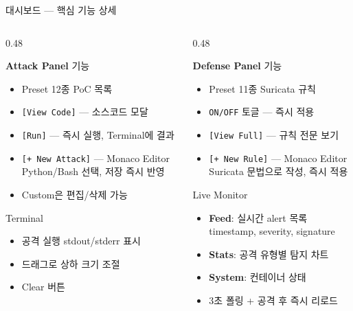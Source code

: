 \documentclass[aspectratio=169,10pt]{beamer}
\newcommand{\red}[1]{\textcolor{redTeam}{\textbf{#1}}}
\newcommand{\blue}[1]{\textcolor{blueTeam}{\textbf{#1}}}
\begin{document}
\begin{frame}{대시보드 — 핵심 기능 상세}
\begin{columns}[T]
\begin{column}{0.48\textwidth}
\begin{block}{\red{Attack Panel} 기능}
\begin{itemize}
    \item Preset 12종 PoC 목록
    \item \texttt{[View Code]} — 소스코드 모달
    \item \texttt{[Run]} — 즉시 실행, Terminal에 결과
    \item \texttt{[+ New Attack]} — Monaco Editor\\
          Python/Bash 선택, 저장 즉시 반영
    \item Custom은 편집/삭제 가능
\end{itemize}
\end{block}
\vspace{0.3em}
\begin{block}{Terminal}
\begin{itemize}
    \item 공격 실행 stdout/stderr 표시
    \item 드래그로 상하 크기 조절
    \item Clear 버튼
\end{itemize}
\end{block}
\end{column}
\begin{column}{0.48\textwidth}
\begin{block}{\blue{Defense Panel} 기능}
\begin{itemize}
    \item Preset 11종 Suricata 규칙
    \item \texttt{ON/OFF} 토글 — 즉시 적용
    \item \texttt{[View Full]} — 규칙 전문 보기
    \item \texttt{[+ New Rule]} — Monaco Editor\\
          Suricata 문법으로 작성, 즉시 적용
\end{itemize}
\end{block}
\vspace{0.3em}
\begin{block}{Live Monitor}
\begin{itemize}
    \item \textbf{Feed}: 실시간 alert 목록\\
          {\scriptsize timestamp, severity, signature}
    \item \textbf{Stats}: 공격 유형별 탐지 차트
    \item \textbf{System}: 컨테이너 상태
    \item 3초 폴링 + 공격 후 즉시 리로드
\end{itemize}
\end{block}
\end{column}
\end{columns}
\end{frame}
\end{document}
